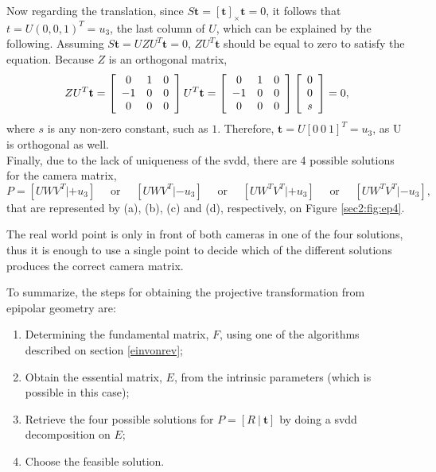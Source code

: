 Now regarding the translation, since $S \mathbf{t} = [\mathbf{t}]_{\times}\mathbf{t} = 0$, it follows that $t = U (0, 0, 1)^T = u_3$, the last column of $U$, which can be explained by the following. Assuming $S \mathbf{t} = U Z U^T \mathbf{t} = 0$, $Z U^T \mathbf{t}$ should be equal to zero to satisfy the equation. Because $Z$ is an orthogonal matrix,
\begin{equation}
Z U^T \mathbf{t} = \left[ \begin{array} { c c c } { 0 } & { 1 } & { 0 } \\ { - 1 } & { 0 } & { 0 } \\ { 0 } & { 0 } & { 0 } \end{array} \right] U^T \mathbf{t}  = \left[ \begin{array} { c c c } { 0 } & { 1 } & { 0 } \\ { - 1 } & { 0 } & { 0 } \\ { 0 } & { 0 } & { 0 } \end{array} \right] \left[ \begin{array} { c } { 0 } \\ { 0} \\ s \end{array} \right] = 0,
\end{equation}
where $s$ is any non-zero constant, such as $1$. Therefore, $\mathbf{t} = U [0 \ 0 \ 1]^T = u_3$, as U is orthogonal as well.\\
Finally, due to the lack of uniqueness of the \acrshort{svdd}, there are 4 possible solutions for the camera matrix,
\begin{equation}
P = \left[UWV^T | + u_{ 3 } \right] \quad \text { or } \quad \left[ UWV^T | - u_ { 3 } \right] \quad \text { or } \quad \left[ UW^T V^T | + u_ { 3 } \right] \quad \text { or } \quad \left[ UW^T V^T |- u _ { 3 } \right],
\end{equation}
that are represented by (a), (b), (c) and (d), respectively, on Figure \ref{sec2:fig:ep4}. 

The real world point is only in front of both cameras in one of the four solutions, thus it is enough to use a single point to decide which of the different solutions produces the correct camera matrix. \cite{multiview}

To summarize, the steps for obtaining the projective transformation from epipolar geometry are:

\begin{enumerate}
	\item Determining the fundamental matrix, $F$, using one of the algorithms described on section \ref{einvonrev};
	\item Obtain the essential matrix, $E$, from the intrinsic parameters (which is possible in this case);
	\item Retrieve the four possible solutions for $P = [R \ | \ \mathbf{t}]$ by doing a \acrshort{svdd} decomposition on $E$;
	\item Choose the feasible solution.
\end{enumerate}

